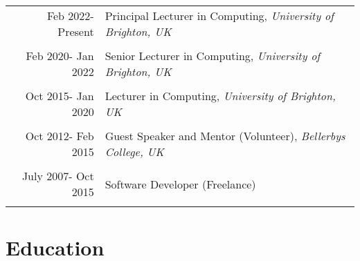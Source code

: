 \documentclass[a4paper,11pt]{article} %
\begin{document}
\begin{tabular}{r|p{11cm}}

Feb 2022- Present & Principal Lecturer in Computing, \emph{University of Brighton, UK}\\
\multicolumn{2}{c}{} \\


Feb 2020- Jan 2022 & Senior Lecturer in Computing, \emph{University of Brighton, UK}\\
\multicolumn{2}{c}{} \\


Oct 2015- Jan 2020 & Lecturer in Computing, \emph{University of Brighton, UK}\\
\multicolumn{2}{c}{} \\


Oct 2012- Feb 2015 & Guest Speaker and Mentor (Volunteer), \emph{Bellerbys College, UK}\\
\multicolumn{2}{c}{} \\

July 2007- Oct 2015 & Software Developer (Freelance)\\
\multicolumn{2}{c}{} \\

\end{tabular}


\section{Education}
\end{document}
